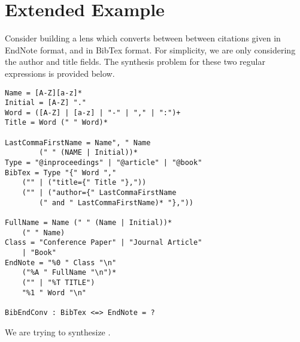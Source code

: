 \section{Extended Example}

Consider building a lens which converts between between citations given
in EndNote format, and in BibTex format.  For simplicity, we are only
considering the author and title fields.  The synthesis problem for these
two regular expressions is provided below.

\begin{lstlisting}
Name = [A-Z][a-z]*
Initial = [A-Z] "."
Word = ([A-Z] | [a-z] | "-" | "," | ":")+
Title = Word (" " Word)*

LastCommaFirstName = Name", " Name
		(" " (NAME | Initial))*
Type = "@inproceedings" | "@article" | "@book"
BibTex = Type "{" Word ","
	("" | ("title={" Title "},"))
	("" | ("author={" LastCommaFirstName
		(" and " LastCommaFirstName)* "},"))

FullName = Name (" " (Name | Initial))*
	(" " Name)
Class = "Conference Paper" | "Journal Article"
	| "Book"
EndNote = "%0 " Class "\n"
	("%A " FullName "\n")*
	("" | "%T TITLE")
	"%1 " Word "\n"

BibEndConv : BibTex <=> EndNote = ?
\end{lstlisting}

We are trying to synthesize \BibEndConv{}.
